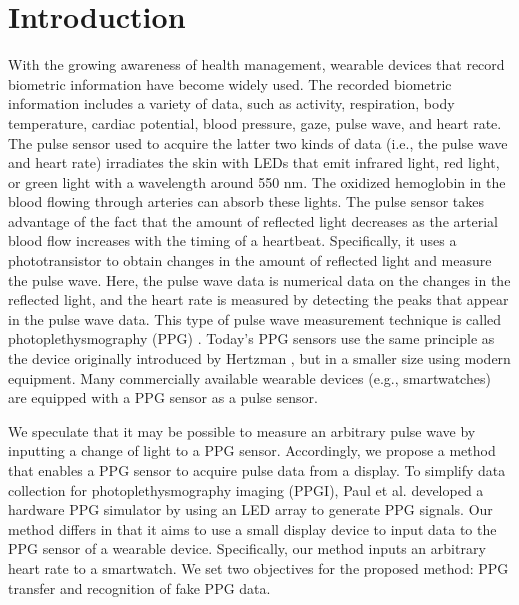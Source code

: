 \documentclass[manuscript,screen,review]{acmart}
\begin{document}
\section{Introduction}
\label{sec:introduction}
With the growing awareness of health management, wearable devices that record biometric information have become widely used. The recorded biometric information includes a variety of data, such as activity, respiration, body temperature, cardiac potential, blood pressure, gaze, pulse wave, and heart rate. The pulse sensor used to acquire the latter two kinds of data (i.e., the pulse wave and heart rate) irradiates the skin with LEDs that emit infrared light, red light, or green light with a wavelength around 550 nm. The oxidized hemoglobin in the blood flowing through arteries can absorb these lights. The pulse sensor takes advantage of the fact that the amount of reflected light decreases as the arterial blood flow increases with the timing of a heartbeat. Specifically, it uses a phototransistor to obtain changes in the amount of reflected light and measure the pulse wave. Here, the pulse wave data is numerical data on the changes in the reflected light, and the heart rate is measured by detecting the peaks that appear in the pulse wave data. This type of pulse wave measurement technique is called photoplethysmography (PPG) \cite{ppg}. Today's PPG sensors use the same principle as the device originally introduced by Hertzman \cite{ppg_principle1, ppg_principle2}, but in a smaller size using modern equipment. Many commercially available wearable devices (e.g., smartwatches) are equipped with a PPG sensor as a pulse sensor.\par

We speculate that it may be possible to measure an arbitrary pulse wave by inputting a change of light to a PPG sensor. Accordingly, we propose a method that enables a PPG sensor to acquire pulse data from a display. To simplify data collection for photoplethysmography imaging (PPGI), Paul et al. \cite{ppg_generator} developed a hardware PPG simulator by using an LED array to generate PPG signals. Our method differs in that it aims to use a small display device to input data to the PPG sensor of a wearable device. Specifically, our method inputs an arbitrary heart rate to a smartwatch. We set two objectives for the proposed method: PPG transfer and recognition of fake PPG data.\par
\end{document}
